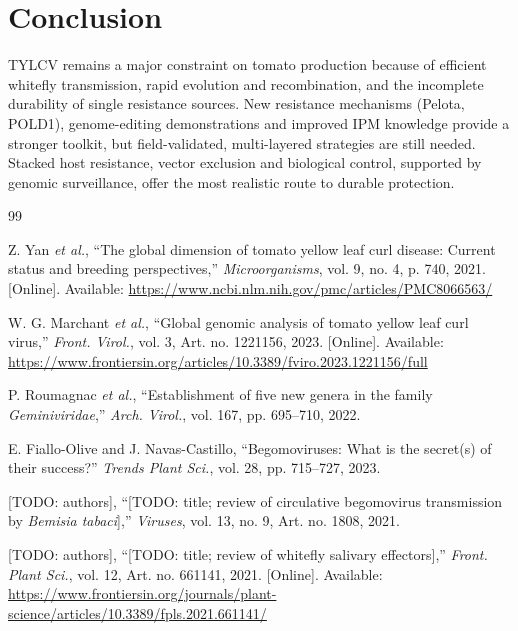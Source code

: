\documentclass[journal]{IEEEtran}
\begin{document}
\section{Conclusion}
TYLCV remains a major constraint on tomato production because of efficient whitefly transmission, rapid evolution and recombination, and the incomplete durability of single resistance sources. New resistance mechanisms (Pelota, POLD1), genome-editing demonstrations and improved IPM knowledge provide a stronger toolkit, but field-validated, multi-layered strategies are still needed. Stacked host resistance, vector exclusion and biological control, supported by genomic surveillance, offer the most realistic route to durable protection.

\begin{thebibliography}{99}

 Z. Yan \textit{et al.}, ``The global dimension of tomato yellow leaf curl disease: Current status and breeding perspectives,'' \textit{Microorganisms}, vol. 9, no. 4, p. 740, 2021. [Online]. Available: \url{https://www.ncbi.nlm.nih.gov/pmc/articles/PMC8066563/} %

 W. G. Marchant \textit{et al.}, ``Global genomic analysis of tomato yellow leaf curl virus,'' \textit{Front. Virol.}, vol. 3, Art. no. 1221156, 2023. [Online]. Available: \url{https://www.frontiersin.org/articles/10.3389/fviro.2023.1221156/full} %

 P. Roumagnac \textit{et al.}, ``Establishment of five new genera in the family \textit{Geminiviridae},'' \textit{Arch. Virol.}, vol. 167, pp. 695--710, 2022. %

 E. Fiallo-Olive and J. Navas-Castillo, ``Begomoviruses: What is the secret(s) of their success?'' \textit{Trends Plant Sci.}, vol. 28, pp. 715--727, 2023. %

 [TODO: authors], ``[TODO: title; review of circulative begomovirus transmission by \textit{Bemisia tabaci}],'' \textit{Viruses}, vol. 13, no. 9, Art. no. 1808, 2021.

 [TODO: authors], ``[TODO: title; review of whitefly salivary effectors],'' \textit{Front. Plant Sci.}, vol. 12, Art. no. 661141, 2021. [Online]. Available: \url{https://www.frontiersin.org/journals/plant-science/articles/10.3389/fpls.2021.661141/}


\end{thebibliography}
\end{document}
